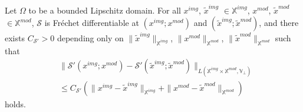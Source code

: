 \documentclass{ws-m3as}
\begin{document}
\begin{proposition}\label{prop:perturb_gen_deriv}
Let $\Omega$ to be a bounded Lipschitz domain.
For all ${x}^{img}$, $\tilde{x}^{img}$ $\in\mathbb{X}^{img}$, ${x}^{mod}$, $\tilde{x}^{mod}$ $\in\mathbb{X}^{mod}$, $\mathcal{S}$ is Fr\'{e}chet differentiable at $(x^{img};x^{mod})$ and $(\tilde{x}^{img};\tilde{x}^{mod})$, and there exists $C_{\mathcal{S}'}>0$ depending only on $\|\tilde{x}^{img}\|_{\mathbb{X}^{img}}$, $\|{x}^{mod}\|_{\mathbb{X}^{mod}}$, $\|\tilde{x}^{mod}\|_{\mathbb{X}^{mod}}$ such that 
\[
\begin{aligned}
&\|\mathcal{S}'(x^{img};x^{mod})-\mathcal{S}'(\tilde{x}^{img};\tilde{x}^{mod})\|_{L(\mathbb{X}^{img}\times\mathbb{X}^{mod},\mathbb{V}_\perp)}\\
&\leq C_{\mathcal{S}'}(\|x^{img}-\tilde{x}^{img}\|_{\mathbb{X}^{img}}+\|x^{mod}-\tilde{x}^{mod}\|_{\mathbb{X}^{mod}})
\end{aligned}
\]
holds.
\end{proposition}
\end{document}
